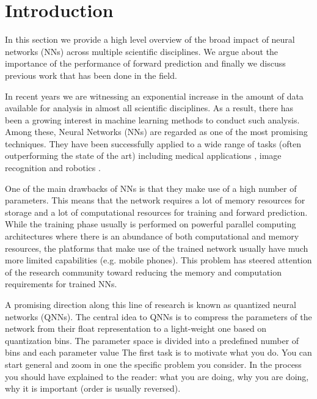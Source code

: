 
\section{Introduction}\label{sec:intro}
In this section we provide a high level overview of the broad impact of neural networks (NNs) across multiple scientific disciplines. We argue about the importance of the performance of forward prediction and finally we discuss previous work that has been done in the field.

 In recent years we are witnessing an exponential increase in the amount of data available for analysis in almost all scientific disciplines. As a result, there has been a growing interest in machine learning methods to conduct such analysis. Among these, Neural Networks (NNs) are regarded as one of the most promising techniques. 
They have been successfully applied to a wide range of tasks (often outperforming the state of the art) including medical applications \cite{amato_artificial_2013}, image recognition \cite{krizhevsky_imagenet_2012} and robotics \cite{gu_deep_2016}. 

One of the main drawbacks of NNs is that they make use of a high number of parameters. This means that the network requires a lot of memory resources for storage and a lot of computational resources for training and forward prediction. While the training phase usually is performed on powerful parallel computing architectures where there is an abundance of both computational and memory resources, the platforms that make use of the trained network usually have much more limited capabilities (e.g. mobile phones). This problem has steered attention of the research community toward reducing the memory and computation requirements for trained NNs.

A promising direction along this line of research is known as quantized neural networks (QNNs). The central idea to QNNs is to compress the parameters of the network from their float representation to a light-weight one based on quantization bins. The parameter space is divided into a predefined number of bins and each parameter value 
 The first task is to motivate what you do.  You can
start general and zoom in one the specific problem you consider.  In
the process you should have explained to the reader: what you are doing,
why you are doing, why it is important (order is usually reversed).

